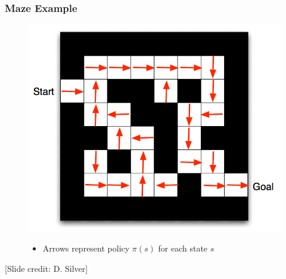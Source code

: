 \documentclass[handout]{beamer}
\begin{document}
\begin{frame}\frametitle{Maze Example}\small
\begin{figure}
\begin{minipage}{0.5\linewidth}
\includegraphics[width=\linewidth]{Figures/maze2}
\end{minipage}
\hspace{3mm}
\begin{minipage}{0.45\linewidth}
\begin{itemize}
\item Arrows represent policy $\pi(s)$ for each state $s$
\end{itemize}
\end{minipage}
\end{figure}

\vspace{14mm}
\scriptsize [Slide credit: D. Silver]
\end{frame}
\end{document}
